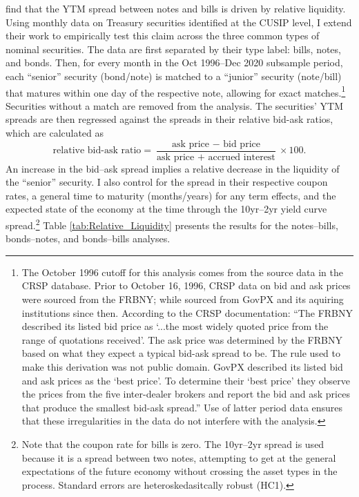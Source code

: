 \documentclass[11pt,a4paper,margin=1.5in]{article}
\begin{document}
\citet{Amihud-Mendelson:1991} find that the YTM spread between notes and bills is driven by relative liquidity.
Using monthly data on Treasury securities identified at the CUSIP level, I extend their work to empirically test this claim across the three common types of nominal securities.
The data are first separated by their type label: bills, notes, and bonds.
Then, for every month in the Oct 1996--Dec 2020 subsample period, each ``senior'' security (bond/note) is matched to a ``junior'' security (note/bill) that matures within one day of the respective note, allowing for exact matches.\footnote{
	The October 1996 cutoff for this analysis comes from the source data in the CRSP database. 
	Prior to October 16, 1996, CRSP data on bid and ask prices were sourced from the FRBNY; while sourced from GovPX and its aquiring institutions since then.
	According to the CRSP documentation: ``The FRBNY described its listed bid price as `...the most widely quoted price from the range of quotations received'. 
	The ask price was determined by the FRBNY based on what they expect a typical bid-ask spread to be. 
	The rule used to make this derivation was not public domain.
	GovPX described its listed bid and ask prices as the `best price'. To determine their `best price' they observe the prices from the five inter-dealer brokers and report the bid and ask prices that produce the smallest bid-ask spread.''
	Use of latter period data ensures that these irregularities in the data do not interfere with the analysis.
}
Securities without a match are removed from the analysis.
The securities' YTM spreads are then regressed against the spreads in their relative bid-ask ratios, which are calculated as 
$$ \text{relative bid-ask ratio} = \frac{\text{ask price }-\text{ bid price}}{\text{ask price }+\text{ accrued interest}}\times 100.$$
An increase in the bid--ask spread implies a relative decrease in the liquidity of the ``senior'' security.
I also control for the spread in their respective coupon rates, a general time to maturity (months/years) for any term effects, and the expected state of the economy at the time through the 10yr--2yr yield curve spread.\footnote{
	Note that the coupon rate for bills is zero.
	The 10yr--2yr spread is used because it is a spread between two notes, attempting to get at the general expectations of the future economy without crossing the asset types in the process. 
	Standard errors are heteroskedasitcally robust (HC1).
}
Table \ref{tab:Relative_Liquidity} presents the results for the notes--bills, bonds--notes, and bonds--bills analyses.
\end{document}
